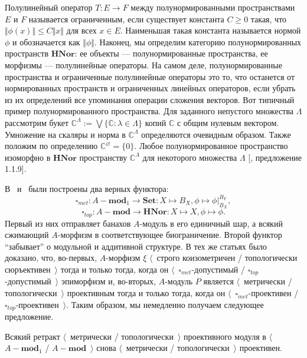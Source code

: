Полулинейный оператор $T:E\to F$ между полунормированными пространствами $E$ и
$F$ называется ограниченным, если существует константа $C\geq 0$ такая, что
$\Vert\phi(x)\Vert\leq C\Vert x\Vert$ для всех $x\in E$. Наименьшая такая
константа называется нормой $\phi$ и обозначается как $\Vert \phi\Vert$.
Наконец, мы определим категорию полунормированных пространств $\mathbf{HNor}$:
ее объекты --- полунормированные пространства, ее морфизмы --- полулинейные
операторы. На самом деле, полунормированные пространства и ограниченные
полулинейные операторы это то, что останется от нормированных пространств и
ограниченных линейных операторов, если убрать из их определений все упоминания
операции сложения векторов. Вот типичный пример  полунормированного
пространства. Для заданного непустого множества $\Lambda$ рассмотрим букет
$\mathbb{C}^\Lambda:=\bigvee  \{\mathbb{C}:\lambda\in\Lambda \}$ копий
$\mathbb{C}$ с общим нулевым вектором. Умножение на скаляры и норма в
$\mathbb{C}^\Lambda$ определяются очевидным образом. Также положим по
определению $\mathbb{C}^\varnothing= \{0 \}$. Любое полунормированное
пространство изоморфно в $\mathbf{HNor}$ пространству $\mathbb{C}^\Lambda$ для
некоторого множества $\Lambda$ [\cite{ShtTopFrClassicQuantMod}, предложение
1.1.9].

В~\cite{HelMetrFrQMod} и~\cite{ShtTopFrClassicQuantMod} были построены два
верных функтора: 
$$
\square_{met}:A-\mathbf{mod}_1\to\mathbf{Set}
:X\mapsto B_X,\phi\mapsto\phi|_{B_X}^{B_Y},
$$
$$
\square_{top}:A-\mathbf{mod}\to\mathbf{HNor}:X\mapsto X,\phi\mapsto\phi.
$$
Первый из них отправляет банахов $A$-модуль в его единичный шар, а всякий
сжимающий $A$-морфизм в соответствующее биограничение. Второй функтор
``забывает'' о модульной и аддитивной структуре. В тех же статьях было доказано,
что, во-первых, $A$-морфизм $\xi$ $\langle$~строго коизометричен / топологически
сюръективен~$\rangle$ тогда и только тогда, когда он
$\langle$~$\square_{met}$-допустимый / $\square_{top}$-допустимый~$\rangle$
эпиморфизм и, во-вторых, $A$-модуль $P$ является $\langle$~метрически /
топологически~$\rangle$ проективным тогда и только тогда, когда он
$\langle$~$\square_{met}$-проективен / $\square_{top}$-проективен~$\rangle$.
Таким образом, мы немедленно получаем следующее предложение.

\begin{proposition}\label{RetrMetTopProjIsMetTopProj} Всякий ретракт
$\langle$~метрически / топологически~$\rangle$ проективного модуля в
$\langle$~$A-\mathbf{mod}_1$ / $A-\mathbf{mod}$~$\rangle$ снова
$\langle$~метрически / топологически~$\rangle$ проективен.
\end{proposition}

